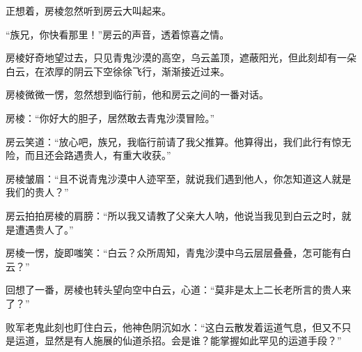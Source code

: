 \begin{this_body}
正想着，房棱忽然听到房云大叫起来。

“族兄，你快看那里！”房云的声音，透着惊喜之情。

房棱好奇地望过去，只见青鬼沙漠的高空，乌云盖顶，遮蔽阳光，但此刻却有一朵白云，在浓厚的阴云下空徐徐飞行，渐渐接近过来。

房棱微微一愣，忽然想到临行前，他和房云之间的一番对话。

房棱：“你好大的胆子，居然敢去青鬼沙漠冒险。”

房云笑道：“放心吧，族兄，我临行前请了我父推算。他算得出，我们此行有惊无险，而且还会路遇贵人，有重大收获。”

房棱皱眉：“且不说青鬼沙漠中人迹罕至，就说我们遇到他人，你怎知道这人就是我们的贵人？”

房云拍拍房棱的肩膀：“所以我又请教了父亲大人呐，他说当我见到白云之时，就是遭遇贵人了。”

房棱一愣，旋即嗤笑：“白云？众所周知，青鬼沙漠中乌云层层叠叠，怎可能有白云？”

回想了一番，房棱也转头望向空中白云，心道：“莫非是太上二长老所言的贵人来了？”

败军老鬼此刻也盯住白云，他神色阴沉如水：“这白云散发着运道气息，但又不只是运道，显然是有人施展的仙道杀招。会是谁？能掌握如此罕见的运道手段？”

\end{this_body}

